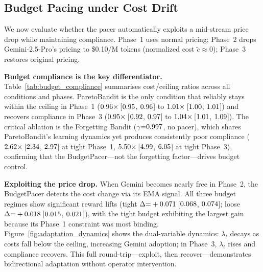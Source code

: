 \subsection{Budget Pacing under Cost Drift}
\label{sec:eval_nonstationary}

We now evaluate whether the pacer automatically exploits a mid-stream price drop while maintaining compliance. Phase~1 uses normal pricing; Phase~2 drops Gemini-2.5-Pro's pricing to \$0.10/M tokens (normalized cost $\tilde{c} \approx 0$); Phase~3 restores original pricing.

\noindent\textbf{Budget compliance is the key differentiator.}
Table~\ref{tab:budget_compliance} summarises cost/ceiling ratios across all conditions and phases. ParetoBandit is the only condition that reliably stays within the ceiling in Phase~1 ($0.96\times$\,[$0.95$, $0.96$] to $1.01\times$\,[$1.00$, $1.01$]) and recovers compliance in Phase~3 ($0.95\times$\,[$0.92$, $0.97$] to $1.04\times$\,[$1.01$, $1.09$]). The critical ablation is the Forgetting Bandit ($\gamma{=}0.997$, no pacer), which shares ParetoBandit's learning dynamics yet produces consistently poor compliance ($2.62\times$\,[$2.34$, $2.97$] at tight Phase~1, $5.50\times$\,[$4.99$, $6.05$] at tight Phase~3), confirming that the BudgetPacer---not the forgetting factor---drives budget control.

\noindent\textbf{Exploiting the price drop.}
When Gemini becomes nearly free in Phase~2, the BudgetPacer detects the cost change via its EMA signal. All three budget regimes show significant reward lifts (tight $\Delta{=}+0.071$\,[$0.068$, $0.074$]; loose $\Delta{=}+0.018$\,[$0.015$, $0.021$]), with the tight budget exhibiting the largest gain because its Phase~1 constraint was most binding. Figure~\ref{fig:adaptation_dynamics} shows the dual-variable dynamics: $\lambda_t$ decays as costs fall below the ceiling, increasing Gemini adoption; in Phase~3, $\lambda_t$ rises and compliance recovers. This full round-trip---exploit, then recover---demonstrates bidirectional adaptation without operator intervention.

